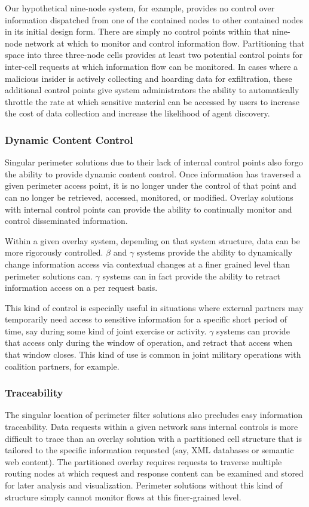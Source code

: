 Our hypothetical nine-node system, for example, provides no control over information dispatched from one of the contained nodes to other contained nodes in its initial design form.  There are simply no control points within that nine-node network at which to monitor and control information flow.  Partitioning that space into three three-node cells provides at least two potential control points for inter-cell requests at which information flow can be monitored.  In cases where a malicious insider is actively collecting and hoarding data for exfiltration, these additional control points give system administrators the ability to automatically throttle the rate at which sensitive material can be accessed by users to increase the cost of data collection and increase the likelihood of agent discovery.

\subsubsection*{Dynamic Content Control}
Singular perimeter solutions due to their lack of internal control points also forgo the ability to provide dynamic content control.  Once information has traversed a given perimeter access point, it is no longer under the control of that point and can no longer be retrieved, accessed, monitored, or modified.  Overlay solutions with internal control points can provide the ability to continually monitor and control disseminated information.

Within a given overlay system, depending on that system structure, data can be more rigorously controlled.  $\beta$ and $\gamma$ systems provide the ability to dynamically change information access via contextual changes at a finer grained level than perimeter solutions can.  $\gamma$ systems can in fact provide the ability to retract information access on a per request basis.

This kind of control is especially useful in situations where external partners may temporarily need access to sensitive information for a specific short period of time, say during some kind of joint exercise or activity.  $\gamma$ systems can provide that access only during the window of operation, and retract that access when that window closes.  This kind of use is common in joint military operations with coalition partners, for example.

\subsubsection*{Traceability}
The singular location of perimeter filter solutions also precludes easy information traceability.  Data requests within a given network sans internal controls is more difficult to trace than an overlay solution with a partitioned cell structure that is tailored to the specific information requested (say, XML databases or semantic web content).  The partitioned overlay requires requests to traverse multiple routing nodes at which request and response content can be examined and stored for later analysis and visualization.  Perimeter solutions without this kind of structure simply cannot monitor flows at this finer-grained level.

